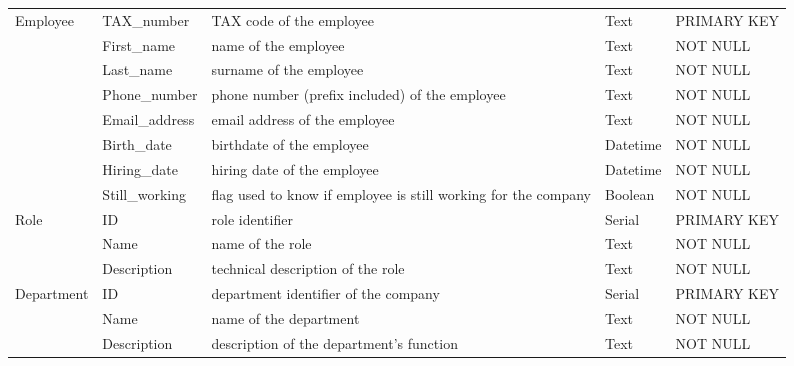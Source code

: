 \begin{longtable}{|p{}|p{} |p{}|p{}|p{} |}
\multirow{8}{*}{Employee} & TAX\_number & TAX code of the employee & Text & PRIMARY KEY\\\cline{2-5}
& First\_name & name of the employee & Text & NOT NULL \\\cline{2-5}
& Last\_name & surname of the employee  & Text & NOT NULL \\\cline{2-5} 
& Phone\_number & phone number (prefix included) of the employee & Text & NOT NULL \\\cline{2-5} 
& Email\_address & email address of the employee & Text & NOT NULL \\\cline{2-5} 
& Birth\_date & birthdate of the employee  & Datetime & NOT NULL \\\cline{2-5} 
& Hiring\_date & hiring date of the employee & Datetime & NOT NULL \\\cline{2-5} 
& Still\_working & flag used to know if employee is still working for the company & Boolean & NOT NULL \\\hline

\multirow{3}{*}{Role} & ID & role identifier & Serial & PRIMARY KEY\\\cline{2-5}
& Name & name of the role & Text & NOT NULL \\\cline{2-5}
& Description & technical description of the role & Text & NOT NULL \\\hline

\multirow{3}{*}{Department} & ID & department identifier of the company & Serial & PRIMARY KEY\\\cline{2-5}
& Name & name of the department & Text & NOT NULL \\\cline{2-5}
& Description & description of the department's function & Text & NOT NULL \\\hline

\end{longtable}